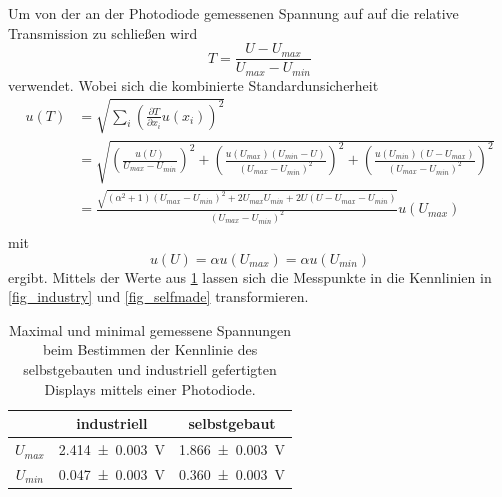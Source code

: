 \documentclass[
	a4paper,
	12pt,
	pagesize,
	ngerman
]{scrartcl}
\begin{document}
	Um von der an der Photodiode gemessenen Spannung auf auf die relative Transmission zu schließen wird %
	\begin{equation}
			T = \frac{U-U_{max}}{U_{max}-U_{min}}
	\end{equation}
	verwendet. Wobei sich die kombinierte Standardunsicherheit
	\begin{align*}
		u(T) &= \sqrt{\sum_{i}\left(\frac{\partial T}{\partial x_i} u(x_i)\right)^2}\\
		&= \sqrt{\left(\frac{u(U)}{U_{max}-U_{min}}\right)^2+\left(\frac{u(U_{max})(U_{min}-U)}{(U_{max}-U_{min})^2}\right)^2+\left(\frac{u(U_{min})(U-U_{max})}{(U_{max}-U_{min})^2}\right)^2} \\
		&=	\frac{\sqrt{ (\alpha^2+1) (U_{max}-U_{min})^2+2U_{max}U_{min}+2U(U-U_{max}-U_{min})}}{(U_{max}-U_{min})^2} u(U_{max}) \\
	\end{align*}
	mit
	\begin{equation*}
			u(U)=\alpha u(U_{max})=\alpha u(U_{min})
	\end{equation*}
	ergibt.
	Mittels der Werte aus \cref{tb_maxmin} lassen sich die Messpunkte in die Kennlinien in \cref{fig_industry} und \cref{fig_selfmade} transformieren.
\begin{table}[H]
		\centering
		\begin{tabular}{ c | c | c }
			 & industriell & selbstgebaut \\ \hline
			$U_{max}$ & \SI{2.414+-0.003}{V} & \SI{1.866+-0.003}{V} \\
			$U_{min}$ & \SI{0.047+-0.003}{V} & \SI{0.360+-0.003}{V} \\
	\hline
		\end{tabular}
		\caption{Maximal und minimal gemessene Spannungen beim Bestimmen der Kennlinie des selbstgebauten und industriell gefertigten Displays mittels einer Photodiode.}
		\label{tb_maxmin}
\end{table}
\end{document}
